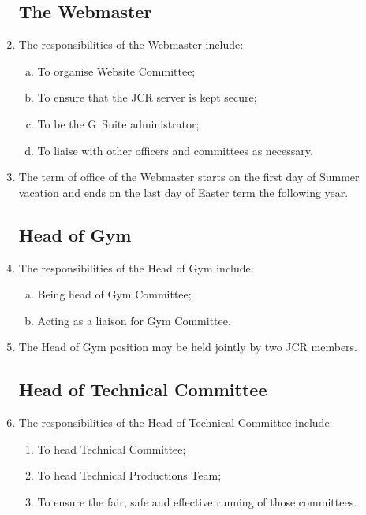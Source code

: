 \documentclass[12pt]{article}
\begin{document}
\begin{enumerate}
    \subsection{The Webmaster}
    \item The responsibilities of the Webmaster include:
    \begin{enumerate}[(a)]
        \item To organise Website Committee;
        \item To ensure that the JCR server is kept secure;
        \item To be the G~Suite administrator;
        \item To liaise with other officers and committees as necessary.
    \end{enumerate}
    \item The term of office of the Webmaster starts on the first day of Summer vacation and ends on the last day of Easter term the following year.

    \subsection{Head of Gym}
    \item The responsibilities of the Head of Gym include:
    \begin{enumerate}[(a)]
        \item Being head of Gym Committee;
        \item Acting as a liaison for Gym Committee.
    \end{enumerate}
    \item The Head of Gym position may be held jointly by two JCR members.

    \subsection{Head of Technical Committee}
    \item The responsibilities of the Head of Technical Committee include:
    \begin{enumerate}
        \item To head Technical Committee;
        \item To head Technical Productions Team;
        \item To ensure the fair, safe and effective running of those committees.
    \end{enumerate}
\end{enumerate}
\newpage
\end{document}
